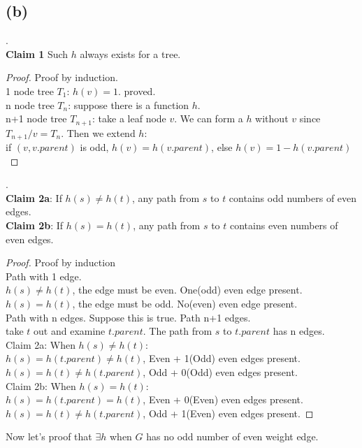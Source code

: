 \documentclass{article}
\begin{document}
\subsection*{(b)}.\\
\textbf{Claim 1} Such $h$ always exists for a tree.
\begin{proof}
	Proof by induction.\\
	1 node tree $T_1$: $h(v) = 1$. proved.\\
	n node tree $T_n$: suppose there is a function $h$.\\
	n+1 node tree $T_{n+1}$: take a leaf node $v$. We can form a $h$ without $v$ since $T_{n+1}/v = T_{n}$. Then we extend $h$: \\
		if $(v, v.parent)$ is odd, $h(v) = h(v.parent)$, else $h(v) = 1 - h(v.parent)$
\end{proof}.\\
\textbf{Claim 2a}: If $h(s) \neq h(t)$, any path from $s$ to $t$ contains odd numbers of even edges.\\
\textbf{Claim 2b}: If $h(s) = h(t)$, any path from $s$ to $t$ contains even numbers of even edges.
\begin{proof}
	Proof by induction \\
	Path with 1 edge. \\
	$h(s) \neq h(t)$, the edge must be even. One(odd) even edge present. \\
	$h(s)   =  h(t)$, the edge must be odd. No(even) even edge present. \\
	Path with n edges. Suppose this is true.
	Path n+1 edges. \\
	take $t$ out and examine $t.parent$. The path from $s$ to $t.parent$ has n edges.\\
	Claim 2a: When $h(s) \neq h(t)$: \\
	$h(s) = h(t.parent) \neq h(t)$, Even + 1(Odd) even edges present.\\
	$h(s) = h(t) \neq h(t.parent)$, Odd + 0(Odd) even edges present.\\
	Claim 2b: When $h(s) = h(t)$: \\
	$h(s) = h(t.parent) = h(t)$, Even + 0(Even) even edges present.\\
	$h(s) = h(t) \neq h(t.parent) $, Odd + 1(Even) even edges present.
\end{proof}
Now let's proof that $\exists h$ when $G$ has no odd number of even weight edge.
\end{document}
